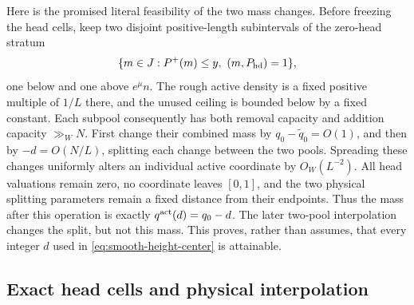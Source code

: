 \documentclass[11pt]{article}
\numberwithin{equation}{section}
\theoremstyle{definition}
\theoremstyle{remark}
\newcommand{\1}{\mathbf 1}
\begin{document}
Here is the promised literal feasibility of the two mass changes.  Before
freezing the head cells, keep two disjoint positive-length subintervals of
the zero-head stratum
\[
 \{m\in J:P^+(m)\leq y,\ (m,P_{\rm hd})=1\},
\]
one below and one above \(e^\mu n\).  The rough active density is a fixed
positive multiple of \(1/L\) there, and the unused ceiling is bounded
below by a fixed constant.  Each subpool consequently has both removal
capacity and addition capacity \(\gg_W N\).  First change their combined
mass by \(q_0-\widetilde q_0=O(1)\), and then by \(-d=O(N/L)\), splitting
each change between the two pools.  Spreading these changes uniformly
alters an individual active coordinate by \(O_W(L^{-2})\).  All head
valuations remain zero, no
coordinate leaves \([0,1]\), and the two physical splitting parameters
remain a fixed distance from their endpoints.  Thus the mass after this
operation is exactly \(q^{\rm act}(d)=q_0-d\).  The later two-pool
interpolation changes the split, but not this mass.  This proves, rather
than assumes, that every integer \(d\) used in
\eqref{eq:smooth-height-center} is attainable.

\subsection{Exact head cells and physical interpolation}
\label{subsec:smooth-head-physical}
\end{document}
